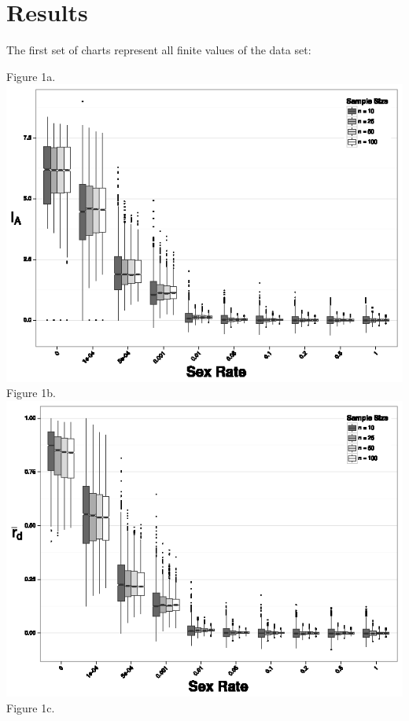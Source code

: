 \documentclass[letterpaper, 10pt]{article}
\newcommand{\tab}{\hspace*{1.5em}}
\begin{document}
\section{Results}
\tab The first set of charts represent all finite values of the data set:

\begin{center}
Figure 1a.\\
\includegraphics{figures/Ia_chart.eps}\\Figure 1b.\\
\includegraphics{figures/rbarD_chart.eps}\\Figure 1c.\\

\end{center}
\end{document}
